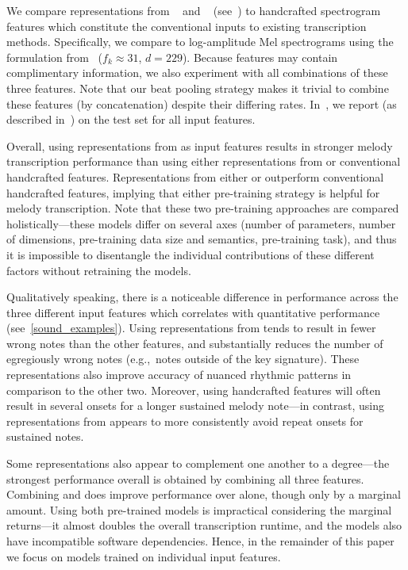 We compare representations from \jukebox~\cite{dhariwal2020jukebox} and \mtthree~\cite{gardner2021mt3} (see~) to handcrafted spectrogram features which constitute the conventional inputs to existing transcription methods. 
Specifically, we compare to log-amplitude Mel spectrograms using the formulation from~\cite{hawthorne2017onsets} ($f_k \approx 31$, $d = 229$). 
Because features may contain complimentary information, we also experiment with all combinations of these three features. 
Note that our beat pooling strategy makes it trivial to combine these features (by concatenation) despite their differing rates. 
In~, we report \fone{} (as described in~) on the \hooktheory{} test set for all input features.

Overall, using representations from \jukebox{} as input features results in stronger melody transcription performance than using either representations from \mtthree{} or conventional handcrafted features. 
Representations from either \mtthree{} or \jukebox{} outperform conventional handcrafted features, 
implying that either pre-training strategy is helpful for melody transcription. 
Note that these two pre-training approaches are compared holistically---these models differ on several axes (number of parameters, number of dimensions, pre-training data size and semantics, pre-training task), 
and thus it is impossible to disentangle the individual contributions of these different factors without retraining the models. 

Qualitatively speaking, there is a noticeable difference in performance across the three different input features which correlates with quantitative performance (see~\cref{sound_examples}). 
Using representations from \jukebox{} tends to result in fewer wrong notes than the other features, and substantially reduces the number of egregiously wrong notes (e.g.,~notes outside of the key signature). 
These representations also improve accuracy of nuanced rhythmic patterns in comparison to the other two. 
Moreover, using handcrafted features will often result in several onsets for a longer sustained melody note---in contrast, using representations from \jukebox{} appears to more consistently avoid repeat onsets for sustained notes. 

Some representations also appear to complement one another to a degree---the strongest performance overall is obtained by combining all three features. 
Combining \mtthree{} and \jukebox{} does improve performance over \jukebox{} alone, though only by a marginal amount. 
Using both pre-trained models is impractical considering the marginal returns---it almost doubles the overall transcription runtime, and the models also have incompatible software dependencies. 
Hence, in the remainder of this paper we focus on models trained on individual input features.

